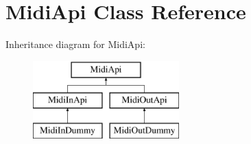 \hypertarget{class_midi_api}{}\section{Midi\+Api Class Reference}
\label{class_midi_api}
Inheritance diagram for Midi\+Api\+:\begin{figure}[H]
\begin{center}
\leavevmode
\includegraphics[height=3.000000cm]{class_midi_api}
\end{center}
\end{figure}
